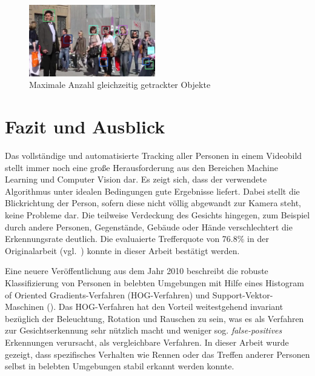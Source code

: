 \documentclass[a4paper, 11pt, twocolumn]{article}
\begin{document}
\begin{figure}[h]
	\begin{center}
		\includegraphics[width=0.49\textwidth]{maxAnzahlFussgaengerTotal.png}
	\end{center}
	\caption{Maximale Anzahl gleichzeitig getrackter Objekte}
	\label{fig:maxanzahl_tracking}
\end{figure}


\section{Fazit und Ausblick} %
\label{sec:fazit_und_ausblick}

Das vollständige und automatisierte Tracking aller Personen in einem Videobild stellt immer noch eine große Herausforderung aus den Bereichen Machine Learning und Computer Vision dar. Es zeigt sich, dass der verwendete Algorithmus unter idealen Bedingungen gute Ergebnisse liefert. Dabei stellt die Blickrichtung der Person, sofern diese nicht völlig abgewandt zur Kamera steht, keine Probleme dar. Die teilweise Verdeckung des Gesichts hingegen, zum Beispiel durch andere Personen, Gegenstände, Gebäude oder Hände verschlechtert die Erkennungsrate deutlich. Die evaluaierte Trefferquote von 76.8\% in der Originalarbeit (vgl.~\cite{aliMultipleHuman}) konnte in dieser Arbeit bestätigt werden.

Eine neuere Veröffentlichung aus dem Jahr 2010 beschreibt die robuste Klassifizierung von Personen in belebten Umgebungen mit Hilfe eines Histogram of Oriented Gradients-Verfahren (HOG-Verfahren) und Support-Vektor-Maschinen (\cite{Takahashi:2010}). Das HOG-Verfahren hat den Vorteil weitestgehend invariant bezüglich der Beleuchtung, Rotation und Rauschen zu sein, was es als Verfahren zur Gesichtserkennung sehr nützlich macht und weniger sog. \emph{false-positives} Erkennungen verursacht, als vergleichbare Verfahren. In dieser Arbeit wurde gezeigt, dass spezifisches Verhalten wie Rennen oder das Treffen anderer Personen selbst in belebten Umgebungen stabil erkannt werden konnte.




\end{document}
